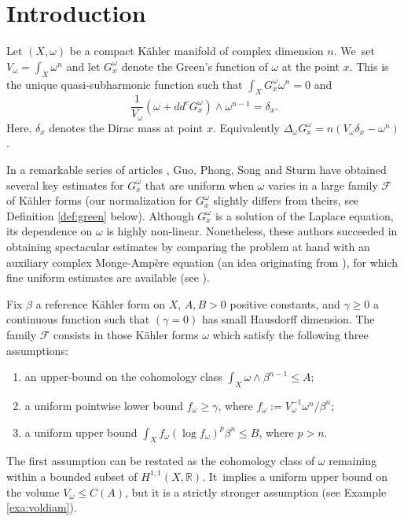 \documentclass[11pt]{article}
\numberwithin{equation}{section}
\theoremstyle{definition}
\newcommand{\R}{\mathbb R}
\begin{document}
\section*{Introduction}

Let $(X,\omega)$ be a compact Kähler manifold of complex dimension $n$. We~set $V_{\omega}=\int_X \omega^n$ and
let $G_x^{\omega}$ denote the Green's function of $\omega$ at the point $x$.
This is the unique quasi-subharmonic function such that $\int_X G_x^{\omega} \omega^n=0$ and
\[
\frac{1}{V_{\omega}} (\omega+dd^c G_x^{\omega}) \wedge \omega^{n-1}=\delta_x.
\]
Here, $\delta_x$ denotes the Dirac mass at point $x$. Equivalently
$\Delta_{\omega} G_x^{\omega}=n( V_{\omega} \delta_x -\omega^n)$.

In a remarkable series of articles \cite{GPS22,GPSS22,GPSS23}, Guo, Phong, Song and Sturm have
obtained several key estimates for $G_x^{\omega}$ that are uniform when $\omega$ varies
in a large family ${\mathcal F}$ of Kähler forms
(our normalization for $G_x^{\omega}$ slightly differs from theirs, see Definition \ref{def:green} below).
Although $G_x^{\omega}$ is a solution of the Laplace equation, its dependence on $\omega$ is highly non-linear.
Nonetheless, these authors succeeded in obtaining spectacular estimates by comparing the problem at hand with an auxiliary
complex Monge-Ampère equation (an idea originating from \cite{CC21}),
for which fine uniform estimates are available
(see \cite{Yau78,Kol98,EGZ09,EGZ08,DP10,BEGZ10,GL21,GPT23}).

Fix $\beta$ a reference Kähler form on $X$,
$A,B>0$ positive constants, and $\gamma \geq 0$ a continuous function such that $(\gamma =0)$ has small Hausdorff dimension.
The family ${\mathcal F}$ consists in those Kähler forms $\omega$
which satisfy the following three assumptions:
\begin{enumerate}
\item an upper-bound on the cohomology class $\int_X \omega \wedge \beta^{n-1} \leq A$;
\item a uniform pointwise lower bound $f_{\omega} \geq \gamma$, where
$f_{\omega}:=V_{\omega}^{-1}\omega^n/\beta^n$;
\item a uniform upper bound $\int_X f_{\omega} (\log f_{\omega})^p \beta^n \leq B$, where $p>n$.
\end{enumerate}

The first assumption can be restated as the cohomology class of $\omega$ remaining within a bounded subset of $H^{1,1}(X,\R)$. It~implies a uniform upper bound on the volume $V_{\omega} \leq C(A)$, but it is a strictly stronger assumption
(see Example \ref{exa:voldiam}).
\end{document}
